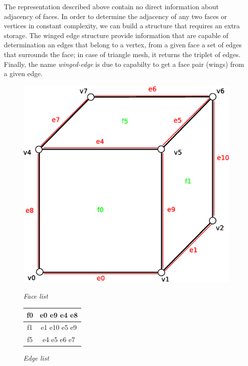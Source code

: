 The representation described above contain no direct information about adjacency of faces. 
In order to determine the adjacency of any two faces or vertices in constant complexity, we
can build a structure that requires an extra storage. The winged edge structure provide information
that are capable of determination an edges that belong to a vertex, from a given face a set
of edges that surrounds the face; in case of triangle mesh, it returns the triplet of edges.
Finally, the name \emph{winged-edge} is due to capabilty to get a face pair (wings) from
a given edge.

\begin{figure}[!htbp]
\label{fig:winged_edge_mesh}

\begin{minipage}[!htbp]{0.65\linewidth}
\centering
\includegraphics[width=0.6\linewidth]{../img/we_rep_mesh.eps}
\label{fig:figure1}
\end{minipage}
\hspace{0.5cm}
\begin{minipage}[!htbp]{0.25\linewidth}
\centering

\emph{Face list}
\vspace{1mm}

\begin{tabular}{|c|c|}
\hline
\textsf{f0} & \textsf{e0 e9 e4 e8}\\
\hline
\textsf{f1} & \textsf{e1 e10 e5 e9}\\
\hline
\textsf{f5} & \textsf{e4 e5 e6 e7}\\
\hline
\end{tabular}

\vspace{10mm}
\emph{Edge list}
\vspace{1mm}


\end{minipage}
\end{figure}
